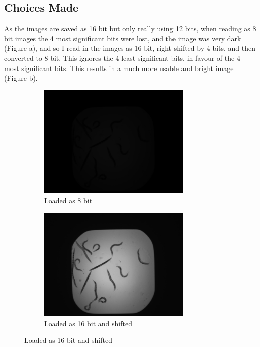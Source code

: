 \documentclass[a4paper,12pt]{article}
\begin{document}
\subsection*{Choices Made}
As the images are saved as 16 bit but only really using 12 bits, when reading as 8 bit images the 4 most significant bits were lost, and the image was very dark (Figure a), and so I read in the images as 16 bit, right shifted by 4 bits, and then converted to 8 bit. This ignores the 4 least significant bits, in favour of the 4 most significant bits. This results in a much more usable and bright image (Figure b).\\
\begin{figure}[ht!]
    \centering
    \begin{subfigure}{0.5\textwidth}
        \centering
        \includegraphics[width=0.8\textwidth]{A01_step0_unshifted.jpg}
        \caption{Loaded as 8 bit}
    \end{subfigure}%
    \begin{subfigure}{0.5\textwidth}
        \centering
        \includegraphics[width=0.8\textwidth]{A01_step0.jpg}
        \caption{Loaded as 16 bit and shifted}
    \end{subfigure}
\end{figure}
\end{document}
